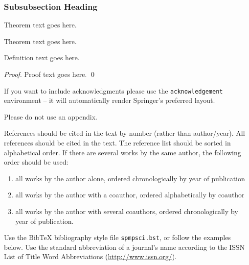 \documentclass[graybox]{svmult}
\begin{document}
\subsubsection{Subsubsection Heading}

\begin{theorem}
Theorem text goes here.
\end{theorem}

\begin{theorem} 
Theorem text goes here.
\end{theorem}
%
%
\begin{definition}
Definition text goes here.
\end{definition}

\begin{proof}
Proof text goes here.
\qed
\end{proof}

%
\begin{acknowledgement}
If you want to include acknowledgments please use the \verb|acknowledgement| environment -- it will automatically render Springer's preferred layout.
\end{acknowledgement}
%

Please do not use an appendix.

\bigskip
%
% 
% 
%
References should be cited in the text by number (rather than author/year). All references should be cited in the text. The reference list should be sorted in alphabetical order. If there are several works by the same author, the following order should be used: 
\begin{enumerate}
\item all works by the author alone, ordered chronologically by year of publication
\item all works by the author with a coauthor, ordered alphabetically by coauthor
\item all works by the author with several coauthors, ordered chronologically by year of publication.
\end{enumerate}
Use the BibTeX bibliography style file \texttt{spmpsci.bst}, or follow the examples below. Use the standard abbreviation of a journal's name according to the ISSN List of Title Word Abbreviations (\url{http://www.issn.org/}).
\end{document}
